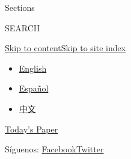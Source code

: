 Sections

SEARCH

\protect\hyperlink{site-content}{Skip to
content}\protect\hyperlink{site-index}{Skip to site index}

\begin{itemize}
\tightlist
\item
  \href{/}{English}
\item
  \href{https://www.nytimes3xbfgragh.onion/es/}{Español}
\item
  \href{https://cn.nytimes3xbfgragh.onion}{中文}
\end{itemize}

\href{https://myaccount.nytimes3xbfgragh.onion/auth/login?response_type=cookie\&client_id=vi}{}

\href{https://www.nytimes3xbfgragh.onion/section/todayspaper}{Today's
Paper}

Síguenos:
\href{https://www.facebookcorewwwi.onion/nytimeses/}{Facebook}\href{https://twitter.com/nytimesES}{Twitter}

